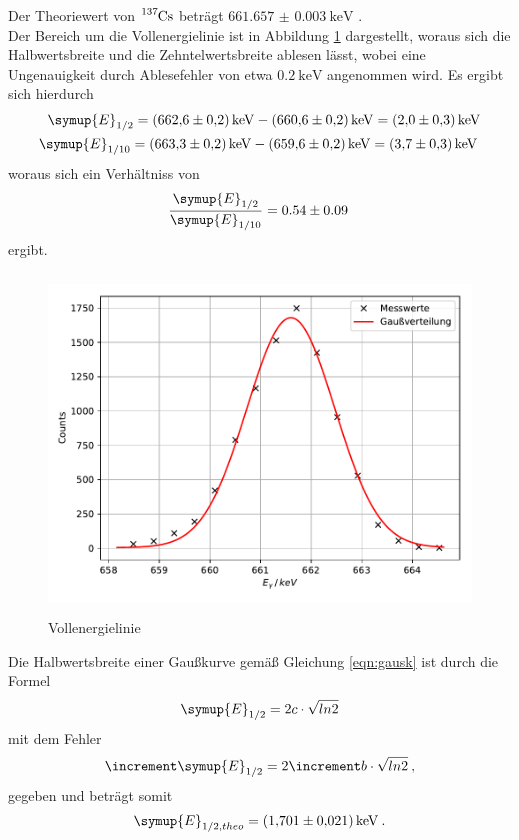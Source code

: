 Der Theoriewert von $\ce{^{137}Cs}$ beträgt $\SI{661.657(3)}{\kilo\electronvolt}$ \cite{lara}. \\
Der Bereich um die Vollenergielinie ist in
Abbildung \ref{fig:plot6} dargestellt, woraus sich die Halbwertsbreite und die
Zehntelwertsbreite ablesen lässt, wobei eine Ungenauigkeit durch
Ablesefehler von etwa $\SI{0.2}{\kilo\electronvolt}$ angenommen wird.
Es ergibt sich hierdurch
\begin{align*}
  \symup{E}_{1/2} = \SI{662.6(2)}{\kilo\electronvolt} -\SI{660.6(2)}{\kilo\electronvolt}
  =\SI{2.0(3)}{\kilo\electronvolt}\\
  \symup{E}_{1/10} = \SI{663.3(2)}{\kilo\electronvolt} -\SI{659.6(2)}{\kilo\electronvolt}
  =\SI{3.7(3)}{\kilo\electronvolt} \:
\end{align*}
woraus sich ein Verhältniss von
\begin{equation}
  \frac{\symup{E}_{1/2}}{\symup{E}_{1/10}} =  0.54 \pm 0.09 \:
\end{equation}
ergibt.
\begin{figure}
  \centering
  \includegraphics[height=9cm]{Plot6.pdf}
  \caption{Vollenergielinie}
  \label{fig:plot6}
\end{figure}
Die Halbwertsbreite einer Gaußkurve gemäß Gleichung \ref{eqn:gausk} ist durch die
Formel
\begin{equation}
  \symup{E}_{1/2} = 2c\cdot\sqrt{ln2}
\end{equation}
mit dem Fehler
\begin{equation}
  \increment \symup{E}_{1/2} = 2\increment b\cdot\sqrt{ln2} \: ,
\end{equation}
gegeben und beträgt somit
\begin{align*}
  \symup{E}_{1/2,theo} = \SI{1.701(21)}{\kilo\electronvolt} \: .
\end{align*}

